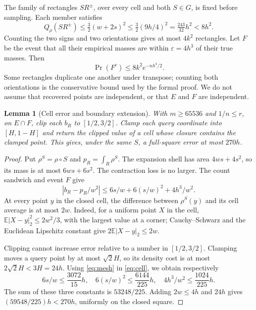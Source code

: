 \documentclass[11pt]{article}
\newtheorem{lemma}[theorem]{Lemma}
\theoremstyle{remark}
\begin{document}
The family of rectangles $SR^\pm$, over every cell and both $S\in G$,
is fixed before sampling. Each member satisfies
\begin{equation}\label{eq:mass}
 Q_\rho(SR^\pm)\le\tfrac32(w+2s)^2
 \le\tfrac32(9h/4)^2=\tfrac{243}{32}h^2<8h^2.
\end{equation}
Counting the two signs and two orientations gives at most $4k^2$
rectangles. Let $F$ be the event that all their empirical masses
are within $\varepsilon=4h^3$ of their true masses. Then
\begin{equation}\label{eq:localfailure}
 \Pr(F^c)\le8k^2e^{-nh^4/2}.
\end{equation}
Some rectangles duplicate one another under transpose; counting both
orientations is the conservative bound used by the formal proof.
We do not assume that recovered points are independent, or that $E$
and $F$ are independent.

\begin{lemma}[Cell error and boundary extension]\label{lem:bias}
With $m\ge65536$ and $1/n\le r$, on $E\cap F$, clip each $b_R$ to
$[1/2,3/2]$. Clamp each query coordinate into $[H,1-H]$ and return
the clipped value of a cell whose closure contains the clamped point.
This gives, under the same $S$, a full-square error at most $270h$.
\end{lemma}
\begin{proof}
Put $\rho^S=\rho\circ S$ and $p_R=\int_R\rho^S$.
The expansion shell has area $4ws+4s^2$, so its mass is at most
$6ws+6s^2$. The contraction loss is no larger.
The count sandwich and event $F$ give
\begin{equation}\label{eq:cell}
 |b_R-p_R/w^2|\le 6s/w+6(s/w)^2+4h^3/w^2.
\end{equation}
At every point $y$ in the closed cell, the difference between
$\rho^S(y)$ and its cell average is at most $2w$.
Indeed, for a uniform point $X$ in the cell,
$\mathbb E|X-y|_2^2\le2w^2/3$, with the largest value at a corner;
Cauchy--Schwarz and the Euclidean Lipschitz constant give
$2\mathbb E|X-y|_2\le2w$.

Clipping cannot increase error relative to a number in $[1/2,3/2]$.
Clamping moves a query point by at most $\sqrt2 H$, so its density
cost is at most $2\sqrt2H<3H=24h$. Using \eqref{eq:mesh} in
\eqref{eq:cell}, we obtain respectively
\[
 6s/w\le\frac{3072}{15}h,\quad
 6(s/w)^2\le\frac{6144}{225}h,\quad
 4h^3/w^2\le\frac{1024}{225}h .
\]
The sum of these three constants is $53248/225$.
Adding $2w\le4h$ and $24h$ gives
$(59548/225)h<270h$, uniformly on the closed square.
\end{proof}
\end{document}
